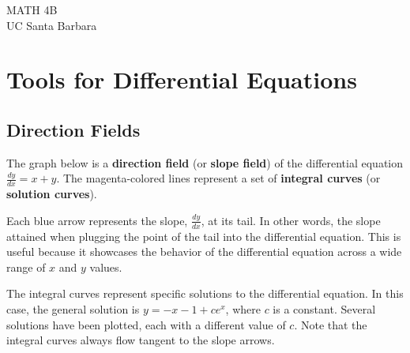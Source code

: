 

	\maketitle
	
	\begin{center}
		MATH 4B \\
		UC Santa Barbara \\
	\end{center}
	
	\section{Tools for Differential Equations}
	\subsection{Direction Fields}
	The graph below is a \textbf{direction field} (or \textbf{slope field}) of the differential equation $\frac{dy}{dx} = x + y$. The magenta-colored lines represent a set of \textbf{integral curves} (or \textbf{solution curves}).
	
	Each blue arrow represents the slope, $\frac{dy}{dx}$, at its tail. In other words, the slope attained when plugging the point of the tail into the differential equation. This is useful because it showcases the behavior of the differential equation across a wide range of $x$ and $y$ values.
	
	The integral curves represent specific solutions to the differential equation. In this case, the general solution is $y = -x - 1 + ce^x$, where $c$ is a constant. Several solutions have been plotted, each with a different value of $c$. Note that the integral curves always flow tangent to the slope arrows.
	
	\begin{center}
	\end{center}
	
